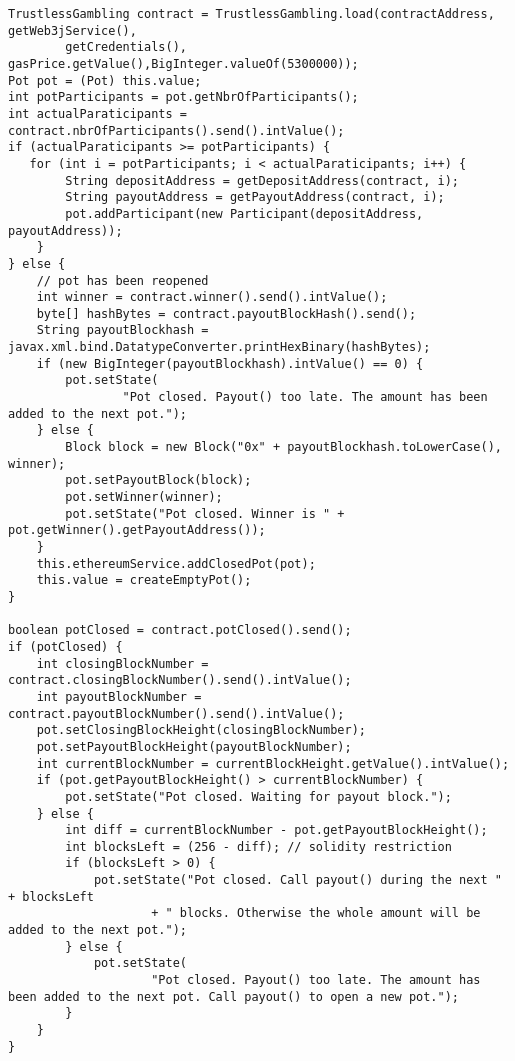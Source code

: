 \begin{lstlisting}[basicstyle=\small]
TrustlessGambling contract = TrustlessGambling.load(contractAddress, getWeb3jService(),
        getCredentials(), gasPrice.getValue(),BigInteger.valueOf(5300000));
Pot pot = (Pot) this.value;
int potParticipants = pot.getNbrOfParticipants();
int actualParaticipants = contract.nbrOfParticipants().send().intValue();
if (actualParaticipants >= potParticipants) {
   for (int i = potParticipants; i < actualParaticipants; i++) {
        String depositAddress = getDepositAddress(contract, i);
        String payoutAddress = getPayoutAddress(contract, i);
        pot.addParticipant(new Participant(depositAddress, payoutAddress));
    }
} else {
    // pot has been reopened
    int winner = contract.winner().send().intValue();
    byte[] hashBytes = contract.payoutBlockHash().send();
    String payoutBlockhash = javax.xml.bind.DatatypeConverter.printHexBinary(hashBytes);
    if (new BigInteger(payoutBlockhash).intValue() == 0) {
        pot.setState(
                "Pot closed. Payout() too late. The amount has been added to the next pot.");
    } else {
        Block block = new Block("0x" + payoutBlockhash.toLowerCase(), winner);
        pot.setPayoutBlock(block);
        pot.setWinner(winner);
        pot.setState("Pot closed. Winner is " + pot.getWinner().getPayoutAddress());
    }
    this.ethereumService.addClosedPot(pot);
    this.value = createEmptyPot();  
}

boolean potClosed = contract.potClosed().send();
if (potClosed) {
    int closingBlockNumber = contract.closingBlockNumber().send().intValue();
    int payoutBlockNumber = contract.payoutBlockNumber().send().intValue();
    pot.setClosingBlockHeight(closingBlockNumber);
    pot.setPayoutBlockHeight(payoutBlockNumber);
    int currentBlockNumber = currentBlockHeight.getValue().intValue();
    if (pot.getPayoutBlockHeight() > currentBlockNumber) {
        pot.setState("Pot closed. Waiting for payout block.");
    } else {
        int diff = currentBlockNumber - pot.getPayoutBlockHeight();
        int blocksLeft = (256 - diff); // solidity restriction
        if (blocksLeft > 0) {
            pot.setState("Pot closed. Call payout() during the next " + blocksLeft
                    + " blocks. Otherwise the whole amount will be added to the next pot.");
        } else {
            pot.setState(
                    "Pot closed. Payout() too late. The amount has been added to the next pot. Call payout() to open a new pot.");
        }
    }
}
\end{lstlisting}


